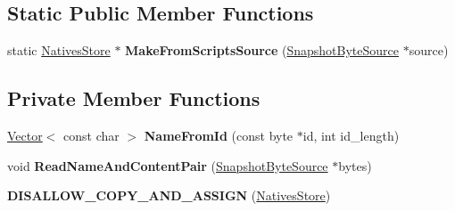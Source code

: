 \subsection*{Static Public Member Functions}
\begin{DoxyCompactItemize}
\item 
static \hyperlink{classv8_1_1internal_1_1_natives_store}{Natives\+Store} $\ast$ {\bfseries Make\+From\+Scripts\+Source} (\hyperlink{classv8_1_1internal_1_1_snapshot_byte_source}{Snapshot\+Byte\+Source} $\ast$source)\hypertarget{classv8_1_1internal_1_1_natives_store_a66dd253bb883f30455bf975b88f5b961}{}\label{classv8_1_1internal_1_1_natives_store_a66dd253bb883f30455bf975b88f5b961}

\end{DoxyCompactItemize}
\subsection*{Private Member Functions}
\begin{DoxyCompactItemize}
\item 
\hyperlink{classv8_1_1internal_1_1_vector}{Vector}$<$ const char $>$ {\bfseries Name\+From\+Id} (const byte $\ast$id, int id\+\_\+length)\hypertarget{classv8_1_1internal_1_1_natives_store_a474336e4b8e8f775b968148453c23710}{}\label{classv8_1_1internal_1_1_natives_store_a474336e4b8e8f775b968148453c23710}

\item 
void {\bfseries Read\+Name\+And\+Content\+Pair} (\hyperlink{classv8_1_1internal_1_1_snapshot_byte_source}{Snapshot\+Byte\+Source} $\ast$bytes)\hypertarget{classv8_1_1internal_1_1_natives_store_aaa63f6290b0daaad3b6e230fb5892d45}{}\label{classv8_1_1internal_1_1_natives_store_aaa63f6290b0daaad3b6e230fb5892d45}

\item 
{\bfseries D\+I\+S\+A\+L\+L\+O\+W\+\_\+\+C\+O\+P\+Y\+\_\+\+A\+N\+D\+\_\+\+A\+S\+S\+I\+GN} (\hyperlink{classv8_1_1internal_1_1_natives_store}{Natives\+Store})\hypertarget{classv8_1_1internal_1_1_natives_store_a4a168983b6b9fb381718f07bc7c20488}{}\label{classv8_1_1internal_1_1_natives_store_a4a168983b6b9fb381718f07bc7c20488}

\end{DoxyCompactItemize}
